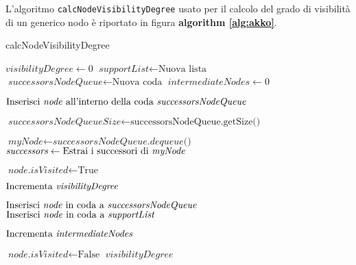 \documentclass[10pt,a4paper,titlepage]{article}
\begin{document}
L'algoritmo \texttt{calcNodeVisibilityDegree} usato per il calcolo del grado di visibilità di un generico nodo è riportato in figura \textbf{algorithm \ref{alg:akko}}.

\begin{center}
\begin{algorithm}
\caption{calcNodeVisibilityDegree}\label{alg:akko}
\begin{algorithmic}[1]

\State $\textit{visibilityDegree} \gets 0$
\State $\textit{supportList} \gets \text{Nuova lista}$
\State $\textit{successorsNodeQueue} \gets \text{Nuova coda}$
\State $\textit{intermediateNodes} \gets 0$

\State $\text{Inserisci \textit{node} all'interno della coda \textit{successorsNodeQueue}}$


	\State $\textit{successorsNodeQueueSize} \gets \text{successorsNodeQueue.getSize()}$

		\State $\textit{myNode} \gets \textit{successorsNodeQueue.dequeue()}$
		\State $\textit{successors} \gets \text{Estrai i successori di \textit{myNode}}$
		
			
			
				\State $\textit{node.isVisited} \gets \text{True}$
			
					\State $\text{Incrementa \textit{visibilityDegree}}$
        			\EndIf			
			
				\State $\text{Inserisci \textit{node} in coda a \textit{successorsNodeQueue}}$
				\State $\text{Inserisci \textit{node} in coda a \textit{supportList}}$
        		\EndIf
		
		\EndFor	
	\EndFor
	
	\State $\text{Incrementa \textit{intermediateNodes}}$




\EndWhile
{} 
		\State $\textit{node.isVisited} \gets \text{False}$
\EndFor
\State \Return $\textit{visibilityDegree}$

\EndFunction
\end{algorithmic}
\end{algorithm}
\end{center}
\end{document}
